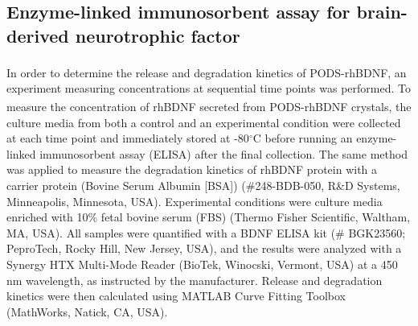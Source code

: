 \documentclass[review]{elsarticle}
\begin{document}
\subsection{Enzyme-linked immunosorbent assay for brain-derived neurotrophic factor}
In order to determine the release and degradation kinetics of PODS\textsuperscript{\textregistered}-rhBDNF, an experiment measuring concentrations at sequential time points was performed. To measure the concentration of rhBDNF secreted from PODS\textsuperscript{\textregistered}-rhBDNF crystals, the culture media from both a control and an experimental condition were collected at each time point and immediately stored at -80$^\circ$C before running an enzyme-linked immunosorbent assay (ELISA) after the final collection. The same method was applied to measure the degradation kinetics of rhBDNF protein with a carrier protein (Bovine Serum Albumin [BSA]) (\#248-BDB-050, R\&D Systems, Minneapolis, Minnesota, USA). Experimental conditions were culture media enriched with 10\% fetal bovine serum (FBS) (Thermo Fisher Scientific, Waltham, MA, USA). All samples were quantified with a BDNF ELISA kit (\# BGK23560; PeproTech, Rocky Hill, New Jersey, USA), and the results were analyzed with a Synergy HTX Multi-Mode Reader (BioTek, Winocski, Vermont, USA) at a 450 nm wavelength, as instructed by the manufacturer. Release and degradation kinetics were then calculated using MATLAB Curve Fitting Toolbox (MathWorks, Natick, CA, USA).
\end{document}
